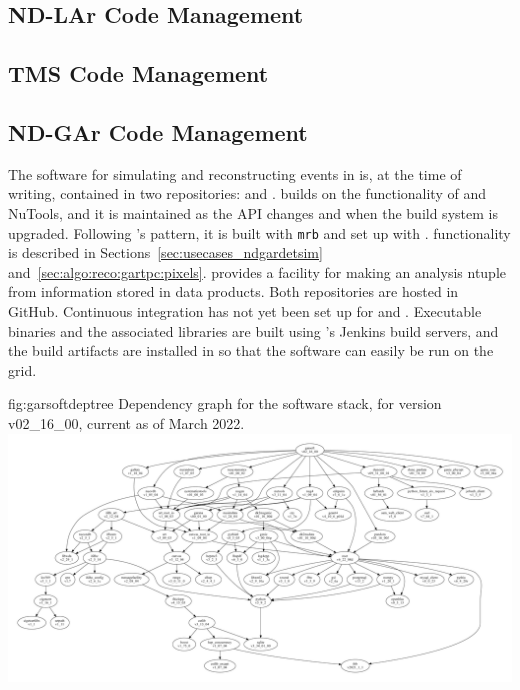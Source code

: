 \documentclass[../main-v1.tex]{subfiles}
\begin{document}
\subsection{ND-LAr Code Management}
\label{sec:codemgmt:ndlar}

\subsection{TMS Code Management}
\label{sec:codemgmt:tms}

\subsection{ND-GAr Code Management}
\label{sec:codemgmt:ndgar}

The software for simulating and reconstructing events in  is, at the time of writing, contained in two repositories:   and .   builds on the functionality of  and NuTools, and it is maintained as the  API changes and when the build system is upgraded.  Following 's pattern, it is built with {\tt mrb} and set up with .   %
 functionality is described in Sections~\ref{sec:usecases_ndgardetsim} and~\ref{sec:algo:reco:gartpc:pixels}.   provides a facility for making an analysis ntuple from information stored in  data products.  Both repositories are hosted in GitHub.  Continuous integration has not yet been set up for  and .  Executable binaries and the associated libraries are built using 's Jenkins build servers, and the build artifacts are installed in  so that the software can easily be run on the grid.

\begin{dunefigure}
{fig:garsoftdeptree}
{Dependency graph for the  software stack, for version v02\_16\_00, current as of March 2022.}
\includegraphics[width=\textwidth]{graphics/CodeManagementFigures/garsoft_v02_16_00_graph.pdf}
\end{dunefigure}
\end{document}

